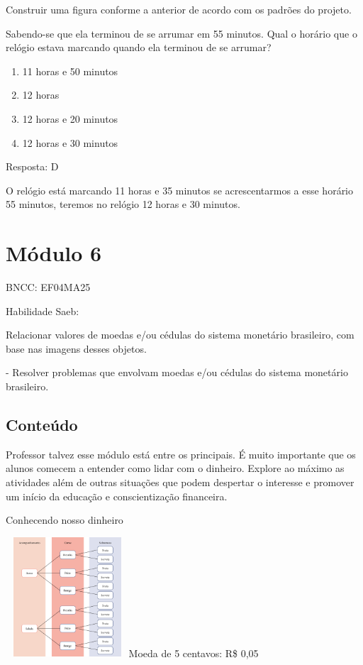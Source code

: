 Construir uma figura conforme a anterior de acordo com os padrões do
projeto.

Sabendo-se que ela terminou de se arrumar em 55 minutos. Qual o horário
que o relógio estava marcando quando ela terminou de se arrumar?

\begin{enumerate}
\def\labelenumi{\alph{enumi})}
\item
  11 horas e 50 minutos
\item
  12 horas
\item
  12 horas e 20 minutos
\item
  12 horas e 30 minutos
\end{enumerate}

Resposta: D

O relógio está marcando 11 horas e 35 minutos se acrescentarmos a esse
horário 55 minutos, teremos no relógio 12 horas e 30 minutos.

\section{Módulo 6}\label{muxf3dulo-6}

BNCC: EF04MA25

Habilidade Saeb:

Relacionar valores de moedas e/ou cédulas do sistema monetário
brasileiro, com base nas imagens desses objetos.

- Resolver problemas que envolvam moedas e/ou cédulas do sistema
monetário brasileiro.

\subsection{Conteúdo}\label{conteuxfado-5}

Professor talvez esse módulo está entre os principais. É muito
importante que os alunos comecem a entender como lidar com o dinheiro.
Explore ao máximo as atividades além de outras situações que podem
despertar o interesse e promover um início da educação e conscientização
financeira.

Conhecendo nosso dinheiro

\includegraphics[width=1.80833in,height=1.75637in]{media/image73.png}Moeda
de 5 centavos: R\$ 0,05

